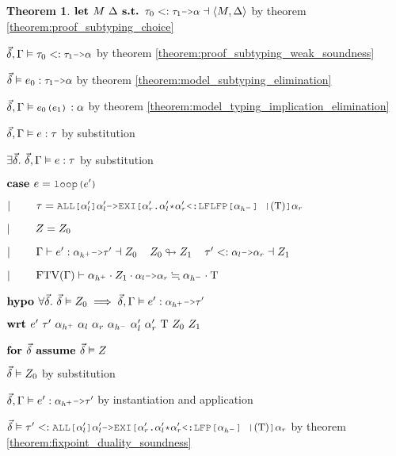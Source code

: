 \documentclass[acmsmall]{acmart}
\theoremstyle{definition}
\newtheorem{theorem}{Theorem}[section]
\begin{document}
\begin{theorem}
    \item \Z\Z $
      \B{let } M\ \Delta
      \B{ s.t. }
      \tau_0 \subtypes \J{$\tau_1$->$\alpha$} \given \left<M, \Delta \right>
    $ by theorem \ref{theorem:proof_subtyping_choice} 
    \item \Z\Z $
      \vec{\delta}, \Gamma \satisfies \tau_0 \subtypes \J{$\tau_1$->$\alpha$} 
    $ by theorem \ref{theorem:proof_subtyping_weak_soundness} 
    \item \Z\Z $
      \vec{\delta} \satisfies e_0 \hastype \J{$\tau_1$->$\alpha$} 
    $ by theorem \ref{theorem:model_subtyping_elimination} 
    \item \Z\Z $
      \vec{\delta}, \Gamma \satisfies \J{$e_0$($e_1$)} \hastype \alpha
    $ by theorem \ref{theorem:model_typing_implication_elimination} 
    \item \Z\Z $
      \vec{\delta}, \Gamma \vDash e : \tau
    $ by substitution 
    \item \Z\Z $
      \exists \vec{\delta} .\ \vec{\delta}, \Gamma \vDash e : \tau
    $ by substitution 

  \item \Z $\B{case } 
    e = \J{loop($e'$)} 
  $ 
  \item \Z $\contin  
    \tau = \J{ALL[$\alpha_l'$]$\alpha_l'$->EXI[$\alpha_r'$.$\alpha_l'$*$\alpha_r'$<:LFLFP[$\alpha_{h^-}$] |$(\Tau)$]$\alpha_r$} 
  $
  \item \Z $|\ \ \ \ \ \ \  
    Z = Z_0 
  $
  \item \Z $\contin  
    \Gamma \entails e' \hastype \J{$\alpha_{h^+}$->$\tau'$} \given Z_0
    \I
    Z_0 \looparrowright Z_1
    \I
    \tau' \subtypes \J{$\alpha_l$->$\alpha_r$} \given Z_1
  $ 
  \item \Z $\contin  
    \text{FTV}(\Gamma) \entails \alpha_{h^+} \cdot Z_1 \cdot \J{$\alpha_l$->$\alpha_r$} \fallingdotseq \alpha_{h^-} \cdot \Tau
  $
  \item \Z $\B{hypo } 
    \forall \vec{\delta} .\ \vec{\delta} \satisfies Z_0 \implies
    \vec{\delta}, \Gamma \satisfies e' \hastype \J{$\alpha_{h^+}$->$\tau'$}
  $ 
  \item \Z $\B{wrt } e'\ \tau'\ \alpha_{h^+}\ \alpha_l\ \alpha_r\ \alpha_{h^-}\ \alpha_l'\ \alpha_r'\ \Tau\ Z_0\ Z_1 $ 
    \item \Z\Z $\textbf{for } \vec{\delta} \textbf{ assume } \vec{\delta} \vDash Z$
      \item \Z\Z\Z $\vec{\delta} \vDash Z_0$ by substitution
      \item \Z\Z\Z $
        \vec{\delta}, \Gamma \satisfies e' \hastype \J{$\alpha_{h^+}$->$\tau'$}
      $ by instantiation and application
      \item \Z\Z\Z $
        \vec{\delta} \satisfies \tau' \subtypes 
        \J{ALL[$\alpha_l'$]$\alpha_l'$->EXI[$\alpha_r'$.$\alpha_l'$*$\alpha_r'$<:LFP[$\alpha_{h^-}$] |$(\Tau)$]$\alpha_r$}
      $ by theorem \ref{theorem:fixpoint_duality_soundness}


\end{theorem}
\end{document}

